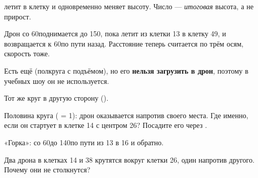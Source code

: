  летит в клетку и одновременно меняет высоту. Число  --- \emph{итоговая} высота, а не прирост.


Дрон со 60\cm поднимается до 150\cm, пока летит из клетки 13 в клетку 49, и возвращается к 60\cm по пути назад. Расстояние теперь считается по трём осям, скорость тоже.

Есть ещё  (полкруга с подъёмом), но его \textbf{нельзя загрузить в дрон}, поэтому в учебных шоу он не используется.

\begin{probuy}
  \item Тот же круг в другую сторону ().
  \item Половина круга ( = 1): дрон оказывается напротив своего места. Где именно, если он стартует в клетке 14 с центром 26? Посадите его через .
  \item «Горка»: со 60\cm до 140\cm по пути из 13 в 16 и обратно.
  \item Два дрона в клетках 14 и 38 крутятся вокруг клетки 26, один напротив другого. Почему они не столкнутся?
\end{probuy}
